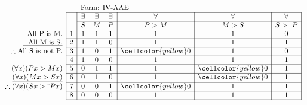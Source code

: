 \documentclass[10pt,legalpaper,landscape,cmtt]{article}
\begin{document}
{\begin{minipage}[t]{3.25in}
	\)
\end{minipage}\begin{minipage}[t]{3.25in}
	\(
	\begin{array}{r|c|ccc|c|c|c|}
		\multicolumn{2}{c}{}&\multicolumn{6}{l}{\mbox{Form: IV-AAE}} \\ \cline{2-8}
		\hspace{1in}	&	& \exists & \exists & \exists & \forall & \forall & \forall\\ \cline{3-8}
		&	& S & M & P &  P > M  &  M > S  &  S > \tilde~P \\ \cline{2-8} \cline{2-8}
		\phantom{\therefore}\mbox{All P is M.}   & 1 & 1 & 1 & 1 &   1   &   1   &   0  \\ \cline{2-8}
		\underline{\phantom{\therefore}\mbox{All M is S.}}   & 2 & 1 & 1 & 0 &   1   &   1   &   1  \\ \cline{2-8}
		\therefore \mbox{All S is not P.}   & 3 & 1 & 0 & 1 &   \cellcolor{yellow} 0   &   1   &   0  \\ \cline{2-8}
		& 4 & 1 & 0 & 0 &   1   &   1   &   1  \\ \cline{2-8}
		(\forall x)(Px > Mx)   & 5 & 0 & 1 & 1 &   1   &   \cellcolor{yellow} 0   &   1  \\ \cline{2-8}
		\underline{(\forall x)(Mx > Sx)}   & 6 & 0 & 1 & 0 &   1   &   \cellcolor{yellow} 0   &   1  \\ \cline{2-8}
		\therefore(\forall x)(Sx > \tilde~Px)   & 7 & 0 & 0 & 1 &   \cellcolor{yellow} 0   &   1   &   1  \\ \cline{2-8}
		& 8 & 0 & 0 & 0 &   1   &   1   &   1   \\ \cline{2-8}\cline{2-8} 
	\end{array}
	\)
\end{minipage}

}
\end{document}
